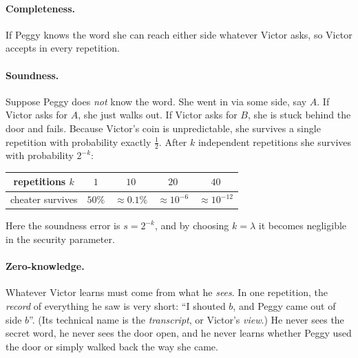 \documentclass[11pt,a4paper]{report}
\theoremstyle{plain}
\theoremstyle{definition}
\theoremstyle{remark}
\begin{document}
\paragraph{Completeness.} If Peggy knows the word she can reach either side whatever Victor asks, so Victor accepts in every repetition.

\paragraph{Soundness.} Suppose Peggy does \emph{not} know the word. She went in via some side, say $A$. If Victor asks for $A$, she just walks out. If Victor asks for $B$, she is stuck behind the door and fails. Because Victor's coin is unpredictable, she survives a single repetition with probability exactly $\tfrac12$. After $k$ independent repetitions she survives with probability $2^{-k}$:

\begin{center}
\renewcommand{\arraystretch}{1.15}
\begin{tabular}{@{}c|cccc@{}}
\toprule
repetitions $k$ & $1$ & $10$ & $20$ & $40$\\ \midrule
cheater survives & $50\%$ & $\approx 0.1\%$ & $\approx 10^{-6}$ & $\approx 10^{-12}$\\
\bottomrule
\end{tabular}
\end{center}
Here the soundness error is $s=2^{-k}$, and by choosing $k=\lambda$ it becomes negligible in the security parameter.

\paragraph{Zero-knowledge.} Whatever Victor learns must come from what he \emph{sees}. In one repetition, the \emph{record} of everything he saw is very short: ``I shouted $b$, and Peggy came out of side $b$''. (Its technical name is the \emph{transcript}, or Victor's \emph{view}.) He never sees the secret word, he never sees the door open, and he never learns whether Peggy used the door or simply walked back the way she came.
\end{document}

